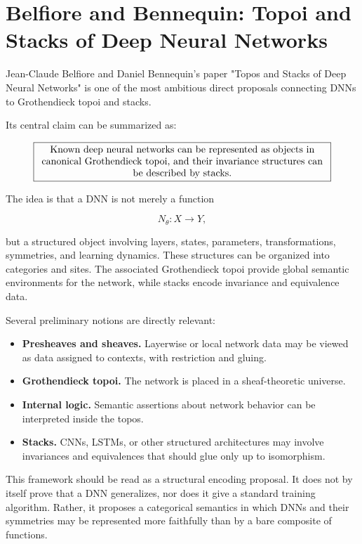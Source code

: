 \documentclass[11pt]{article}
\begin{document}
\section{Belfiore and Bennequin: Topoi and Stacks of Deep Neural Networks}

Jean-Claude Belfiore and Daniel Bennequin's paper "Topos and Stacks of Deep Neural Networks" is one of the most ambitious direct proposals connecting DNNs to Grothendieck topoi and stacks.


Its central claim can be summarized as:


\[
\boxed{\parbox{0.86\textwidth}{\centering
Known deep neural networks can be represented as objects in canonical
Grothendieck topoi, and their invariance structures can be described by stacks.}}
\]

The idea is that a DNN is not merely a function


\[
N_\theta:X\to Y,
\]

but a structured object involving layers, states, parameters, transformations, symmetries, and learning dynamics. These structures can be organized into categories and sites. The associated Grothendieck topoi provide global semantic environments for the network, while stacks encode invariance and equivalence data.


Several preliminary notions are directly relevant:


\begin{itemize}
\item \textbf{Presheaves and sheaves.} Layerwise or local network data may be viewed as
data assigned to contexts, with restriction and gluing.

\item \textbf{Grothendieck topoi.} The network is placed in a sheaf-theoretic universe.
\item \textbf{Internal logic.} Semantic assertions about network behavior can be
interpreted inside the topos.

\item \textbf{Stacks.} CNNs, LSTMs, or other structured architectures may involve
invariances and equivalences that should glue only up to isomorphism.

\end{itemize}

This framework should be read as a structural encoding proposal. It does not by itself prove that a DNN generalizes, nor does it give a standard training algorithm. Rather, it proposes a categorical semantics in which DNNs and their symmetries may be represented more faithfully than by a bare composite of functions.
\end{document}
